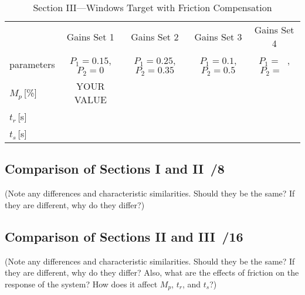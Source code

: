 \documentclass{article}
\newcommand{\score}{\hfill \underline{\hspace{0.65cm}}\,/} %
\begin{document}
\begin{table}[phtb]\footnotesize \label{tbl:lab5_q1_4}
\begin{center}
\caption{Section III---Windows Target with Friction Compensation}
\begin{tabular}{l|m{1.2cm}|m{1.2cm}|m{1.2cm}|m{1.2cm}|m{1.2cm}|m{1.2cm}|m{1.2cm}|m{1.2cm}} \hline \hline
\cellcolor{lightgray} & \multicolumn{2}{c|}{\cellcolor{lightgray}Gains Set 1} & \multicolumn{2}{c|}{\cellcolor{lightgray}Gains Set 2} & \multicolumn{2}{c|}{\cellcolor{lightgray}Gains Set 3} & \multicolumn{2}{c}{\cellcolor{lightgray}Gains Set 4}\\ \cline{2-9}
\multirow{-2}{*}{\cellcolor{lightgray}parameters}& \multicolumn{2}{c|}{$P_1 = 0.15$, $P_2 = 0$}& \multicolumn{2}{c|}{$P_1 = 0.25$, $P_2 = 0.35$}& \multicolumn{2}{c|}{$P_1 = 0.1$, $P_2 = 0.5$}& \multicolumn{2}{c}{$P_1 = ~~~$, $P_2 = ~~~$}\\ \hline
$M_p$\,[\%]& \multicolumn{2}{c|}{YOUR VALUE} & \multicolumn{2}{c|}{~} & \multicolumn{2}{c|}{~} & \multicolumn{2}{c}{~} \\ \hline
$t_r$\,[\si{\second}] & \multicolumn{2}{c|}{} & \multicolumn{2}{c|}{} & \multicolumn{2}{c|}{} & \multicolumn{2}{c}{} \\ \hline
$t_s$\,[\si{\second}] & \multicolumn{2}{c|}{} & \multicolumn{2}{c|}{} & \multicolumn{2}{c|}{} & \multicolumn{2}{c}{} \\ \hline
\end{tabular}
\end{center}
\end{table}


\subsection{Comparison of Sections I and II \score 8}
(Note any differences and characteristic similarities. Should they be the same? If they are different, why do they differ?)


\subsection{Comparison of Sections II and III \score 16}
(Note any differences and characteristic similarities. Should they be the same? If they
are different, why do they differ? Also, what are the effects of friction on the response of
the system? How does it affect $M_p$, $t_r$, and $t_s$?)
\end{document}
